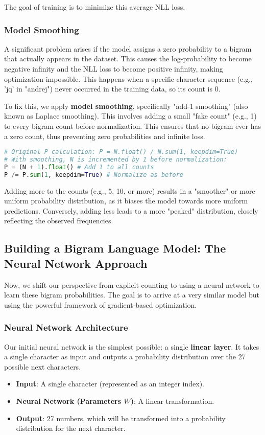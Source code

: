 The goal of training is to minimize this average NLL loss.

\subsubsection{Model Smoothing}
A significant problem arises if the model assigns a zero probability to a bigram that actually appears in the dataset. This causes the log-probability to become negative infinity and the NLL loss to become positive infinity, making optimization impossible. This happens when a specific character sequence (e.g., 'jq' in "andrej") never occurred in the training data, so its count is 0.

To fix this, we apply \textbf{model smoothing}, specifically "add-1 smoothing" (also known as Laplace smoothing). This involves adding a small "fake count" (e.g., 1) to every bigram count before normalization. This ensures that no bigram ever has a zero count, thus preventing zero probabilities and infinite loss.

\begin{lstlisting}[language=Python, caption=Model Smoothing by adding 1 to all counts]
# Original P calculation: P = N.float() / N.sum(1, keepdim=True)
# With smoothing, N is incremented by 1 before normalization:
P = (N + 1).float() # Add 1 to all counts
P /= P.sum(1, keepdim=True) # Normalize as before
\end{lstlisting}

Adding more to the counts (e.g., 5, 10, or more) results in a "smoother" or more uniform probability distribution, as it biases the model towards more uniform predictions. Conversely, adding less leads to a more "peaked" distribution, closely reflecting the observed frequencies.

\subsection{Building a Bigram Language Model: The Neural Network Approach}
Now, we shift our perspective from explicit counting to using a neural network to learn these bigram probabilities. The goal is to arrive at a very similar model but using the powerful framework of gradient-based optimization.

\subsubsection{Neural Network Architecture}
Our initial neural network is the simplest possible: a single \textbf{linear layer}. It takes a single character as input and outputs a probability distribution over the 27 possible next characters.
\begin{itemize}
    \item \textbf{Input}: A single character (represented as an integer index).
    \item \textbf{Neural Network (Parameters $W$)}: A linear transformation.
    \item \textbf{Output}: 27 numbers, which will be transformed into a probability distribution for the next character.
\end{itemize}

